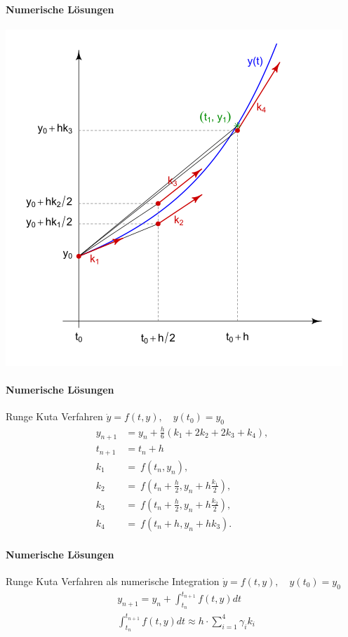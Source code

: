 \documentclass{beamer}
\begin{document}
 \begin{frame}
\framesubtitle{Numerische Lösungen}
\includegraphics[scale=0.6]{images/Runge-Kutta}

\end{frame}

 \begin{frame}
\framesubtitle{Numerische Lösungen}
    \begin{block}{Runge Kuta Verfahren}
$\dot{y}=f(t,y), \quad  y(t_0)=y_0$
\begin{align}
y_{n+1} &= y_n + \frac{h}{6}\left(k_1 + 2k_2 + 2k_3 + k_4 \right),\\
t_{n+1} &= t_n + h \\
 k_1 &= \ f(t_n, y_n), \\
 k_2 &= \ f\!\left(t_n + \frac{h}{2}, y_n + h \frac{k_1}{2}\right), \\ 
 k_3 &= \ f\!\left(t_n + \frac{h}{2}, y_n + h \frac{k_2}{2}\right), \\
 k_4 &= \ f\!\left(t_n + h, y_n + h k_3\right).
\end{align}
    \end{block}
\end{frame}

 \begin{frame}
\framesubtitle{Numerische Lösungen}
    \begin{block}{Runge Kuta Verfahren als numerische Integration}
$\dot{y}=f(t,y), \quad  y(t_0)=y_0$
\begin{align}
& y_{n+1} = y_n + \int_{t_n}^{t_{n+1}} f(t, y) dt \\
&  \int_{t_n}^{t_{n+1}} f(t, y) dt \approx h \cdot \sum_{i=1}^4 \gamma_i k_i
\end{align}
    \end{block}
\end{frame}
\end{document}
